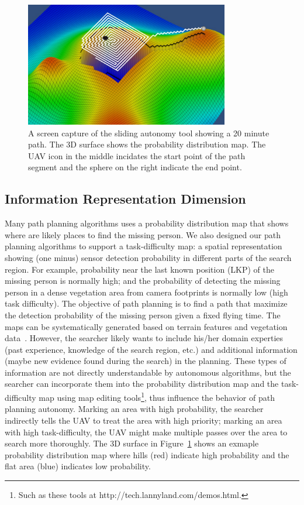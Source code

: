 \documentclass[journal]{IEEEtran}
\begin{document}
\begin{figure}
\centering
\includegraphics[width=3.5in]{Dimensions.JPG}
\caption{A screen capture of the sliding autonomy tool showing a 20 minute path. The 3D surface shows the probability distribution map. The UAV icon in the middle incidates the start point of the path segment and the sphere on the right indicate the end point.}
\label{dimensions}
\end{figure}

\subsection{Information Representation Dimension}

Many path planning algorithms uses a probability distribution map that shows where are likely places to find the missing person. We also designed our path planning algorithms to support a task-difficulty map: a spatial representation showing (one minus) sensor detection probability in different parts of the search region. For example, probability near the last known position (LKP) of the missing person is normally high; and the probability of detecting the missing person in a dense vegetation area from camera footprints is normally low (high task difficulty). The objective of path planning is to find a path that maximize the detection probability of the missing person given a fixed flying time. The maps can be systematically generated based on terrain features and vegetation data~\cite{Lin2010Bayesian, Lin2014Hierarchical}. However, the searcher likely wants to include his/her domain experties (past experience, knowledge of the search region, etc.) and additional information (maybe new evidence found during the search) in the planning. These types of information are not directly understandable by autonomous algorithms, but the searcher can incorporate them into the probability distribution map and the task-difficulty map using map editing tools\footnote{Such as these tools at http://tech.lannyland.com/demos.html.}, thus influence the behavior of path planning autonomy. Marking an area with high probability, the searcher indirectly tells the UAV to treat the area with high priority; marking an area with high task-difficulty, the UAV might make multiple passes over the area to search more thoroughly. The 3D surface in Figure~\ref{dimensions} shows an exmaple probability distribution map where hills (red) indicate high probability and the flat area (blue) indicates low probability.
\end{document}
